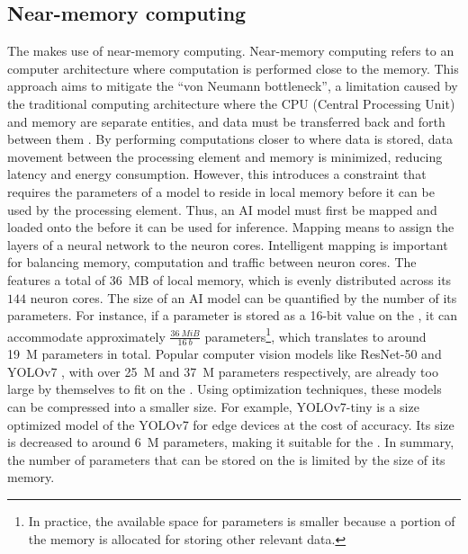 \subsection{Near-memory computing}
The \graicore{} makes use of near-memory computing.
Near-memory computing refers to an computer architecture where computation is performed close to the memory.
This approach aims to mitigate the ``von Neumann bottleneck'', a limitation caused by the traditional computing architecture where the CPU (Central Processing Unit) and memory are separate entities, and data must be transferred back and forth between them \cite{indiveriMemoryInformationProcessing2015}.
By performing computations closer to where data is stored, data movement between the processing element and memory is minimized, reducing latency and energy consumption.
However, this introduces a constraint that requires the parameters of a model to reside in local memory before it can be used by the processing element.
Thus, an AI model must first be mapped and loaded onto the \graicore{} before it can be used for inference.
Mapping means to assign the layers of a neural network to the neuron cores.
Intelligent mapping is important for balancing memory, computation and traffic between neuron cores.
The \graicore{} features a total of \SI{36}{MB} of local memory, which is evenly distributed across its $144$ neuron cores.
The size of an AI model can be quantified by the number of its parameters.
For instance, if a parameter is stored as a 16-bit value on the \graicore{}, it can accommodate approximately $\frac{\SI{36}{MiB}}{\SI{16}{b}}$ parameters\footnote{In practice, the available space for parameters is smaller because a portion of the memory is allocated for storing other relevant data.}, which translates to around \SI{19}{M} parameters in total.
Popular computer vision models like ResNet-50 \cite{heDeepResidualLearning2015} and YOLOv7 \cite{wangYOLOv7TrainableBagoffreebies2022}, with over \SI{25}{M} and \SI{37}{M} parameters respectively, are already too large by themselves to fit on the \graicore{}.
Using optimization techniques, these models can be compressed into a smaller size.
For example, YOLOv7-tiny \cite{wangYOLOv7TrainableBagoffreebies2022} is a size optimized model of the YOLOv7 for edge devices at the cost of accuracy.
Its size is decreased to around \SI{6}{M} parameters, making it suitable for the \graicore{}.
In summary, the number of parameters that can be stored on the \graicore{} is limited by the size of its memory.

